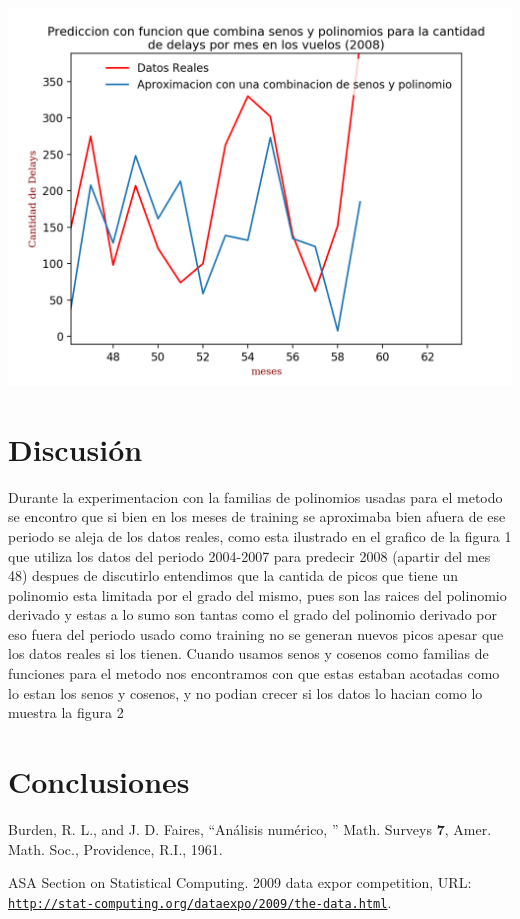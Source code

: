 \documentclass{endm}
\begin{document}
	\begin{center}
	\includegraphics[scale=0.8]{imagenes/delays2008.png}
	\end{center}

\section{Discusi\'on}
	Durante la experimentacion con la familias de polinomios usadas para el metodo se encontro que si bien en los meses de training se aproximaba bien afuera de ese periodo se aleja de los datos reales, como esta ilustrado en el grafico de la figura 1 que utiliza los datos del periodo 2004-2007 para predecir 2008 (apartir del mes 48) despues de discutirlo entendimos que la cantida de picos que tiene un polinomio esta limitada por el grado del mismo, pues son las raices del polinomio derivado y estas a lo sumo son tantas como el grado del polinomio derivado por eso fuera del periodo usado como training no se generan nuevos picos apesar que los datos reales si los tienen. Cuando usamos senos y cosenos como familias de funciones para el metodo nos encontramos con que estas estaban acotadas como lo estan los senos y cosenos, y no podian crecer si los datos lo hacian como lo muestra la figura 2





\section{Conclusiones}




\begin{thebibliography}{10}\label{bibliography}
  
 Burden, R. L., and J. D. Faires, ``An\'alisis num\'erico,
'' Math. Surveys \textbf{7}, Amer. Math. Soc.,
  Providence, R.I., 1961.
  
 ASA Section on Statistical Computing. 2009 data expor competition, URL:
  \href{http://stat-computing.org/dataexpo/2009/the-data.html}
  {\texttt{http://stat-computing.org/dataexpo/2009/the-data.html}}.

\end{thebibliography}
\end{document}
